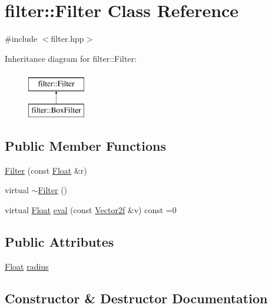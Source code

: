 \hypertarget{classfilter_1_1Filter}{}\section{filter\+::Filter Class Reference}
\label{classfilter_1_1Filter}


{\ttfamily \#include $<$filter.\+hpp$>$}

Inheritance diagram for filter\+::Filter\+:\begin{figure}[H]
\begin{center}
\leavevmode
\includegraphics[height=2.000000cm]{classfilter_1_1Filter}
\end{center}
\end{figure}
\subsection*{Public Member Functions}
\begin{DoxyCompactItemize}
\item 
\mbox{\hyperlink{classfilter_1_1Filter_a7965f0d0f56cc8547f4e01832af5c6e1}{Filter}} (const \mbox{\hyperlink{cyclop_8hpp_a07afd7094cb489cbd514c76e6f55d34f}{Float}} \&r)
\item 
virtual \mbox{\hyperlink{classfilter_1_1Filter_a7af41fa0bbe0989c78070d6ed81787a2}{$\sim$\+Filter}} ()
\item 
virtual \mbox{\hyperlink{cyclop_8hpp_a07afd7094cb489cbd514c76e6f55d34f}{Float}} \mbox{\hyperlink{classfilter_1_1Filter_a0d77f7ce8b9b519b4b086e1c01125ec1}{eval}} (const \mbox{\hyperlink{cyclop_8hpp_a0c5eff6545fe0b71d0592c88d930b697}{Vector2f}} \&v) const =0
\end{DoxyCompactItemize}
\subsection*{Public Attributes}
\begin{DoxyCompactItemize}
\item 
\mbox{\hyperlink{cyclop_8hpp_a07afd7094cb489cbd514c76e6f55d34f}{Float}} \mbox{\hyperlink{classfilter_1_1Filter_a9ac4d0dcde52699b63c4b07b030db86b}{radius}}
\end{DoxyCompactItemize}


\subsection{Constructor \& Destructor Documentation}
\mbox{\label{classfilter_1_1Filter_a7965f0d0f56cc8547f4e01832af5c6e1}} 
